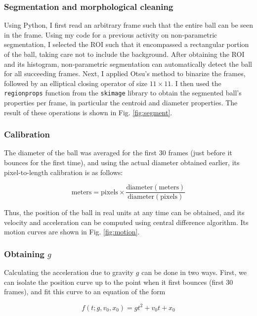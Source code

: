 \documentclass[12pt,a4paper]{article}
\begin{document}
\subsubsection{Segmentation and morphological cleaning}
Using Python, I first read an arbitrary frame such that the entire ball can be seen in the frame. Using my code for a previous activity on non-parametric segmentation, I selected the ROI such that it encompassed a rectangular portion of the ball, taking care not to include the background. After obtaining the ROI and its histogram, non-parametric segmentation can automatically detect the ball for all succeeding frames. Next, I applied Otsu's method to binarize the frames, followed by an elliptical closing operator of size $11 \times 11$. I then used the \texttt{regionprops} function from the \texttt{skimage} library to obtain the segmented ball's properties per frame, in particular the centroid and diameter properties. The result of these operations is shown in Fig. \ref{fig:segment}.

\subsubsection{Calibration}
The diameter of the ball was averaged for the first 30 frames (just before it bounces for the first time), and using the actual diameter obtained earlier, its pixel-to-length calibration is as follows:

\begin{equation}\label{eq:calibration}
	\mathrm{meters = pixels \times \frac{diameter (meters)}{diameter (pixels)}}
\end{equation}

Thus, the position of the ball in real units at any time can be obtained, and its velocity and acceleration can be computed using central difference algorithm. Its motion curves are shown in Fig. \ref{fig:motion}.

\subsubsection{Obtaining $g$}
Calculating the acceleration due to gravity $g$ can be done in two ways. First, we can isolate the position curve up to the point when it first bounces (first 30 frames), and fit this curve to an equation of the form

\begin{equation}\label{eq:curve-fit}
	f(t; g, v_0, x_0) = gt^2 + v_0 t + x_0
\end{equation}
\end{document}

